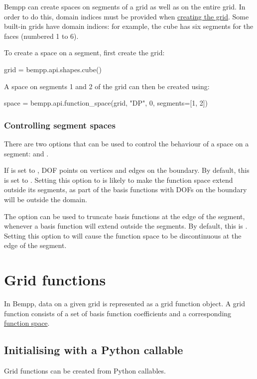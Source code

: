 \documentclass[a4paper]{book}
\begin{document}
Bempp can create spaces on segments of a grid as well as on the entire grid.
In order to do this, domain indices must be provided when \href{creating_grids.md}{creating the grid}.
Some built-in grids have domain indices: for example, the cube has six segments
for the faces (numbered 1 to 6).

To create a space on a segment, first create the grid:
\begin{python}
grid = bempp.api.shapes.cube()
\end{python}

A space on segments 1 and 2 of the grid can then be created using:
\begin{python}
space = bempp.api.function_space(grid, "DP", 0, segments=[1, 2])
\end{python}

\subsection{ Controlling segment spaces}There are two options that can be used to control the behaviour of a space on a segment:
 and .

If  is set to , DOF points on vertices and edges on the boundary.
By default, this is set to . Setting this option to  is likely to make the
function space extend outside its segments, as part of the basis functions with DOFs on the
boundary will be outside the domain.

The option  can be used to truncate basis functions at the edge of the
segment, whenever a basis function will extend outside the segments. By default, this is .
Setting this option to  will cause the function space to be discontinuous at the edge
of the segment.


\chapter{Grid functions}


In Bempp, data on a given grid is represented as a grid function object.
A grid function consists of a set of basis function coefficients and a corresponding \href{function_spaces.md}{function space}.


\section{ Initialising with a Python callable}Grid functions can be created from Python callables.
\end{document}
